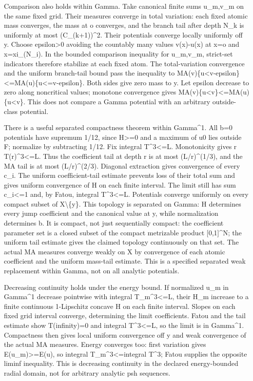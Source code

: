 \documentclass[11pt]{article}
\begin{document}
Comparison also holds within Gamma. Take canonical finite sums u\_m,v\_m on the same fixed grid. Their measures converge in total variation: each fixed atomic mass converges, the mass at o converges, and the branch tail after depth N\_k is uniformly at most (C\_(k+1))\textasciicircum{}2. Their potentials converge locally uniformly off y. Choose epsilon>0 avoiding the countably many values v(x)-u(x) at x=o and x=xi\_(N\_i). In the bounded comparison inequality for u\_m,v\_m, strict-set indicators therefore stabilize at each fixed atom. The total-variation convergence and the uniform branch-tail bound pass the inequality to MA(v)\{u<v-epsilon\}<=MA(u)\{u<=v-epsilon\}. Both sides give zero mass to y. Let epsilon decrease to zero along noncritical values; monotone convergence gives MA(v)\{u<v\}<=MA(u)\{u<v\}. This does not compare a Gamma potential with an arbitrary outside-class potential.

There is a useful separated compactness theorem within Gamma\textasciicircum{}1. All b=0 potentials have supremum 1/12, since H>=0 and a maximum of u0 lies outside F; normalize by subtracting 1/12. Fix integral T\textasciicircum{}3<=L. Monotonicity gives r T(r)\textasciicircum{}3<=L. Thus the coefficient tail at depth r is at most (L/r)\textasciicircum{}(1/3), and the MA tail is at most (L/r)\textasciicircum{}(2/3). Diagonal extraction gives convergence of every c\_i. The uniform coefficient-tail estimate prevents loss of their total sum and gives uniform convergence of H on each finite interval. The limit still has sum c\_i<=1 and, by Fatou, integral T\textasciicircum{}3<=L. Potentials converge uniformly on every compact subset of X\textbackslash{}\{y\}. This topology is separated on Gamma: H determines every jump coefficient and the canonical value at y, while normalization determines b. It is compact, not just sequentially compact: the coefficient parameter set is a closed subset of the compact metrizable product [0,1]\textasciicircum{}N; the uniform tail estimate gives the claimed topology continuously on that set. The actual MA measures converge weakly on X by convergence of each atomic coefficient and the uniform mass-tail estimate. This is a specified separated weak replacement within Gamma, not on all analytic potentials.

Decreasing continuity holds under the energy bound. If normalized u\_m in Gamma\textasciicircum{}1 decrease pointwise with integral T\_m\textasciicircum{}3<=L, their H\_m increase to a finite continuous 1-Lipschitz concave H on each finite interval. Slopes on each fixed grid interval converge, determining the limit coefficients. Fatou and the tail estimate show T(infinity)=0 and integral T\textasciicircum{}3<=L, so the limit is in Gamma\textasciicircum{}1. Compactness then gives local uniform convergence off y and weak convergence of the actual MA measures. Energy converges too: first variation gives E(u\_m)>=E(u), so integral T\_m\textasciicircum{}3<=integral T\textasciicircum{}3; Fatou supplies the opposite liminf inequality. This is decreasing continuity in the declared energy-bounded radial domain, not for arbitrary analytic psh sequences.
\end{document}
